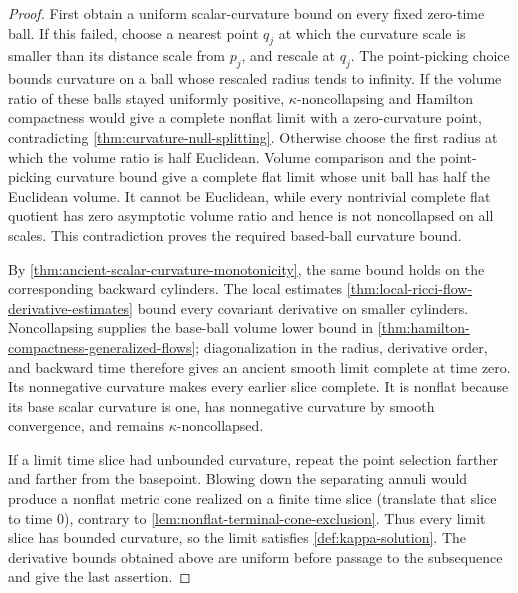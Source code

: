 \begin{proof}
First obtain a uniform scalar-curvature bound on every fixed zero-time ball.
If this failed, choose a nearest point $q_j$ at which the curvature scale is
smaller than its distance scale from $p_j$, and rescale at $q_j$.  The
point-picking choice bounds curvature on a ball whose rescaled radius tends
to infinity.  If the volume ratio of these balls stayed uniformly positive,
$\kappa$-noncollapsing and Hamilton compactness would give a complete
nonflat limit with a zero-curvature point, contradicting
\ref{thm:curvature-null-splitting}.  Otherwise choose the first radius at
which the volume ratio is
half Euclidean.  Volume comparison and the point-picking curvature bound
give a complete flat limit whose unit ball has half the Euclidean volume.
It cannot be Euclidean, while every nontrivial complete flat quotient has
zero asymptotic volume ratio and hence is not noncollapsed on all scales.
This contradiction proves the required based-ball curvature bound.

By \ref{thm:ancient-scalar-curvature-monotonicity}, the same bound holds on
the corresponding backward cylinders.  The local estimates
\ref{thm:local-ricci-flow-derivative-estimates} bound every covariant
derivative on smaller cylinders.
Noncollapsing supplies the base-ball volume lower bound in
\ref{thm:hamilton-compactness-generalized-flows}; diagonalization in the
radius, derivative order, and backward time therefore gives an ancient
smooth limit complete at time zero.  Its nonnegative curvature makes every
earlier slice complete.  It is nonflat because its base scalar curvature is
one, has nonnegative curvature by smooth convergence, and remains
$\kappa$-noncollapsed.

If a limit time slice had unbounded curvature, repeat the point selection
farther and farther from the basepoint.  Blowing down the separating annuli
would produce a nonflat metric cone realized on a finite time slice (translate
that slice to time $0$),
contrary to \ref{lem:nonflat-terminal-cone-exclusion}.  Thus every limit
slice has bounded curvature, so the limit satisfies
\ref{def:kappa-solution}.  The derivative bounds obtained above are uniform
before passage to the subsequence and give the last assertion.
\end{proof}

